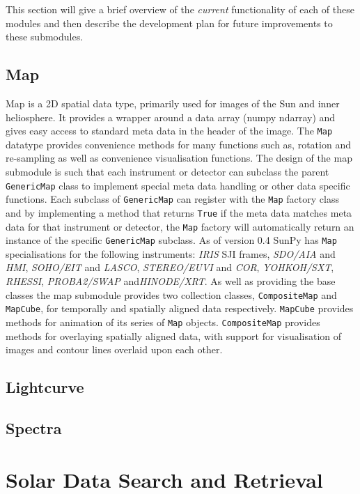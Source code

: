 \documentclass[12pt]{iopart}
\begin{document}
This section will give a brief overview of the \textit{current} functionality 
of each of these modules and then describe the development plan for future 
improvements to these submodules.

	\subsection{Map}
	Map is a 2D spatial data type, primarily used for images of the Sun and 
	inner heliosphere. It provides a wrapper around a data array (numpy 
	ndarray) and gives easy access to standard meta data in the header of the 
	image.
	The \texttt{Map} datatype provides convenience methods for many functions 
	such as, rotation and re-sampling as well as convenience visualisation 
	functions.
	The design of the map submodule is such that each instrument or 
	detector can subclass the parent \texttt{GenericMap} class to implement 
	special meta data handling or other data specific functions. Each subclass 
	of \texttt{GenericMap} can register with the \texttt{Map} factory class and 
	by implementing a method that returns \texttt{True} if the meta data 
	matches meta data for that instrument or detector, the \texttt{Map} factory 
	will automatically return an instance of the specific \texttt{GenericMap} 
	subclass. As of version 0.4 SunPy has \texttt{Map} specialisations for the 
	following instruments: \textit{IRIS} SJI frames, \textit{SDO/AIA} and 
	\textit{HMI}, \textit{SOHO/EIT} and 	\textit{LASCO}, 
	\textit{STEREO/EUVI} 	and \textit{COR}, \textit{YOHKOH/SXT}, 
	\textit{RHESSI}, \textit{PROBA2/SWAP} and\textit{HINODE/XRT}.
	As well as providing the base classes the map submodule provides two 
	collection classes, \texttt{CompositeMap} and \texttt{MapCube}, for 
	temporally and spatially aligned data respectively. \texttt{MapCube} 
	provides methods for animation of its series of \texttt{Map} objects. 
	\texttt{CompositeMap} provides methods for overlaying spatially aligned 
	data, with support for visualisation of images and contour lines overlaid 
	upon each other.
	
	\subsection{Lightcurve}
	
	\subsection{Spectra}

\section{Solar Data Search and Retrieval}
\end{document}
